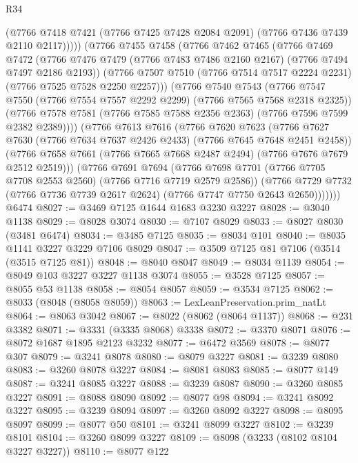 \begin{lexlean}{R34}
\begin{coremodule}
              (@7766 @7418 @7421 (@7766 @7425 @7428 @2084 @2091) (@7766 @7436 @7439 @2110 @2117)))))
        (@7766
          @7455
          @7458
          (@7766
            @7462
            @7465
            (@7766
              @7469
              @7472
              (@7766 @7476 @7479 (@7766 @7483 @7486 @2160 @2167) (@7766 @7494 @7497 @2186 @2193))
              (@7766 @7507 @7510 (@7766 @7514 @7517 @2224 @2231) (@7766 @7525 @7528 @2250 @2257)))
            (@7766
              @7540
              @7543
              (@7766 @7547 @7550 (@7766 @7554 @7557 @2292 @2299) (@7766 @7565 @7568 @2318 @2325))
              (@7766 @7578 @7581 (@7766 @7585 @7588 @2356 @2363) (@7766 @7596 @7599 @2382 @2389))))
          (@7766
            @7613
            @7616
            (@7766
              @7620
              @7623
              (@7766 @7627 @7630 (@7766 @7634 @7637 @2426 @2433) (@7766 @7645 @7648 @2451 @2458))
              (@7766 @7658 @7661 (@7766 @7665 @7668 @2487 @2494) (@7766 @7676 @7679 @2512 @2519)))
            (@7766
              @7691
              @7694
              (@7766 @7698 @7701 (@7766 @7705 @7708 @2553 @2560) (@7766 @7716 @7719 @2579 @2586))
              (@7766
                @7729
                @7732
                (@7766 @7736 @7739 @2617 @2624)
                (@7766 @7747 @7750 @2643 @2650)))))))
    @6474
@8027 := @3469 @7125 @1644 @1683 @3230 @3227
@8028 := @3040 @1138
@8029 := @8028 @3074
@8030 := @7107 @8029
@8033 := @8027 @8030 (@3481 @6474)
@8034 := @3485 @7125
@8035 := @8034 @101
@8040 := @8035 @1141 @3227 @3229 @7106 @8029
@8047 := @3509 @7125 @81 @7106 (@3514 (@3515 @7125 @81))
@8048 := @8040 @8047
@8049 := @8034 @1139
@8054 := @8049 @103 @3227 @3227 @1138 @3074
@8055 := @3528 @7125
@8057 := @8055 @53 @1138
@8058 := @8054 @8057
@8059 := @3534 @7125
@8062 := @8033 (@8048 (@8058 @8059))
@8063 := LexLeanPreservation.prim_natLt
@8064 := @8063 @3042
@8067 := @8022 (@8062 (@8064 @1137))
@8068 := @231 @3382
@8071 := @3331 (@3335 @8068) @3338
@8072 := @3370 @8071
@8076 := @8072 @1687 @1895 @2123 @3232
@8077 := @6472 @3569
@8078 := @8077 @307
@8079 := @3241 @8078
@8080 := @8079 @3227
@8081 := @3239 @8080
@8083 := @3260 @8078 @3227
@8084 := @8081 @8083
@8085 := @8077 @149
@8087 := @3241 @8085 @3227
@8088 := @3239 @8087
@8090 := @3260 @8085 @3227
@8091 := @8088 @8090
@8092 := @8077 @98
@8094 := @3241 @8092 @3227
@8095 := @3239 @8094
@8097 := @3260 @8092 @3227
@8098 := @8095 @8097
@8099 := @8077 @50
@8101 := @3241 @8099 @3227
@8102 := @3239 @8101
@8104 := @3260 @8099 @3227
@8109 := @8098 (@3233 (@8102 @8104 @3227 @3227))
@8110 := @8077 @122

\end{coremodule}
\end{lexlean}
